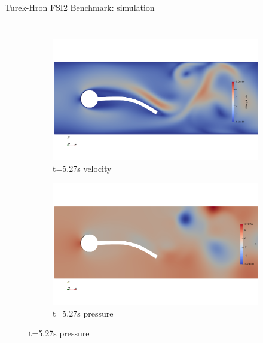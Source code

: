 \documentclass[10pt,t]{beamer}
\begin{document}
\begin{frame}{Turek-Hron FSI2 Benchmark: simulation}
\begin{columns}
\begin{figure}[htb]
\begin{subfigure}{0.5\textwidth}
  \includegraphics[width=\linewidth, trim=0 120 0 120, clip]{images/FSI2/fsi2_v3.png}
  \caption{t=5.27s velocity}
  \label{fig:fsi2_v3}
\end{subfigure}\hfil %
\begin{subfigure}{0.5\textwidth}
  \includegraphics[width=\linewidth, trim=0 120 0 120, clip]{images/FSI2/fsi2_p3.png}
  \caption{t=5.27s pressure}
  \label{fig:fsi2_p3}
\end{subfigure}\hfil %

\label{fig:FSI2_sol}
\end{figure}



\end{columns}
\end{frame}
\end{document}

